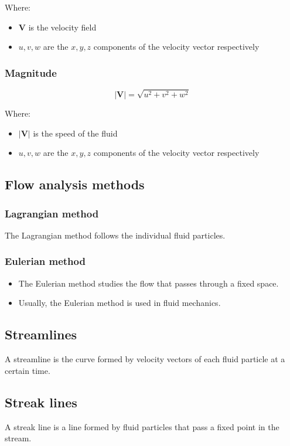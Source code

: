 \documentclass[11pt]{article}
\begin{document}
Where:
\begin{itemize}
\item \(\boldsymbol{V}\) is the velocity field
\item \(u, v, w\) are the \(x, y, z\) components of the velocity vector respectively
\end{itemize}

\subsubsection{Magnitude}
\label{sec:orgc5e1aa6}
\[\left| \boldsymbol{V} \right| = \sqrt{u^2 + v^2 + w^2}\]

Where:
\begin{itemize}
\item \(\left| \boldsymbol{V} \right|\) is the speed of the fluid
\item \(u, v, w\) are the \(x, y, z\) components of the velocity vector respectively
\end{itemize}

\subsection{Flow analysis methods}
\label{sec:org1f79d46}

\subsubsection{Lagrangian method}
\label{sec:orgc19cb07}
The Lagrangian method follows the individual fluid particles.

\subsubsection{Eulerian method}
\label{sec:orgc0a982e}
\begin{itemize}
\item The Eulerian method studies the flow that passes through a fixed space.
\item Usually, the Eulerian method is used in fluid mechanics.
\end{itemize}

\subsection{Streamlines}
\label{sec:org3c41857}
A streamline is the curve formed by velocity vectors of each fluid particle at a certain time.

\subsection{Streak lines}
\label{sec:org41654f9}
A streak line is a line formed by fluid particles that pass a fixed point in the stream.
\end{document}
